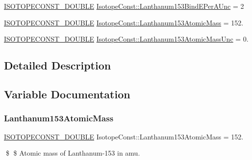 \begin{DoxyCompactItemize}
\mbox{\hyperlink{group___isotope_const-_macros_ga8f45a7272ce02c0b4c65c44636ed719a}{I\+S\+O\+T\+O\+P\+E\+C\+O\+N\+S\+T\+\_\+\+D\+O\+U\+B\+LE}} \mbox{\hyperlink{group___isotope_const-_lanthanum-_la153_ga0ccf1d9a711cc36742f350851bdad531}{Isotope\+Const\+::\+Lanthanum153\+Bind\+E\+Per\+A\+Unc}} = 2
\item 
\mbox{\hyperlink{group___isotope_const-_macros_ga8f45a7272ce02c0b4c65c44636ed719a}{I\+S\+O\+T\+O\+P\+E\+C\+O\+N\+S\+T\+\_\+\+D\+O\+U\+B\+LE}} \mbox{\hyperlink{group___isotope_const-_lanthanum-_la153_gad4c9781d1ec7428f67998c7324dbd604}{Isotope\+Const\+::\+Lanthanum153\+Atomic\+Mass}} = 152.
\item 
\mbox{\hyperlink{group___isotope_const-_macros_ga8f45a7272ce02c0b4c65c44636ed719a}{I\+S\+O\+T\+O\+P\+E\+C\+O\+N\+S\+T\+\_\+\+D\+O\+U\+B\+LE}} \mbox{\hyperlink{group___isotope_const-_lanthanum-_la153_gaacb003767624e16f1f26072ec8e1ee96}{Isotope\+Const\+::\+Lanthanum153\+Atomic\+Mass\+Unc}} = 0.
\end{DoxyCompactItemize}


\subsection{Detailed Description}


\subsection{Variable Documentation}
\mbox{\label{group___isotope_const-_lanthanum-_la153_gad4c9781d1ec7428f67998c7324dbd604}} 
\subsubsection{\texorpdfstring{Lanthanum153\+Atomic\+Mass}{Lanthanum153AtomicMass}}
{\footnotesize\ttfamily \mbox{\hyperlink{group___isotope_const-_macros_ga8f45a7272ce02c0b4c65c44636ed719a}{I\+S\+O\+T\+O\+P\+E\+C\+O\+N\+S\+T\+\_\+\+D\+O\+U\+B\+LE}} Isotope\+Const\+::\+Lanthanum153\+Atomic\+Mass = 152.}

\$ \$ Atomic mass of Lanthanum-\/153 in amu. \mbox{\label{group___isotope_const-_lanthanum-_la153_gaacb003767624e16f1f26072ec8e1ee96}} 
